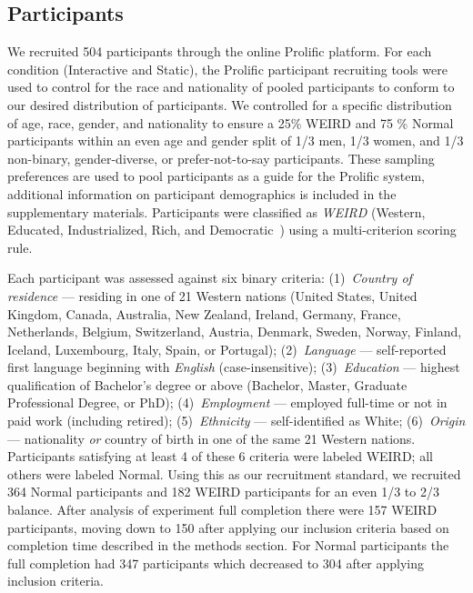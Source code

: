 \subsection{Participants}
We recruited 504 participants through the online Prolific platform. For each condition (Interactive and Static), the Prolific participant recruiting tools were used to control for the race and nationality of pooled participants to conform to our desired distribution of participants. We controlled for a specific distribution of age, race, gender, and nationality to ensure a 25\% WEIRD and 75 \% Normal participants within an even age and gender split of 1/3 men, 1/3 women, and 1/3 non-binary, gender-diverse, or prefer-not-to-say participants. These sampling preferences are used to pool participants as a guide for the Prolific system, additional information on participant demographics is included in the supplementary materials. Participants were classified as \emph{WEIRD} (Western, Educated, Industrialized, Rich, and Democratic~\citep{henrich2010weirdest}) using a multi-criterion scoring rule. 

Each participant was assessed against six binary criteria: (1)~\textit{Country of residence} --- residing in one of 21 Western nations (United States, United Kingdom, Canada, Australia, New Zealand, Ireland, Germany, France, Netherlands, Belgium, Switzerland, Austria, Denmark, Sweden, Norway, Finland, Iceland, Luxembourg, Italy, Spain, or Portugal); (2)~\textit{Language} --- self-reported first language beginning with \emph{English} (case-insensitive); (3)~\textit{Education} --- highest qualification of Bachelor's degree or above (Bachelor, Master, Graduate Professional Degree, or PhD); (4)~\textit{Employment} --- employed full-time or not in paid work (including retired); (5)~\textit{Ethnicity} --- self-identified as White; (6)~\textit{Origin} --- nationality \emph{or} country of birth in one of the same 21 Western nations. Participants satisfying at least 4 of these 6 criteria were labeled WEIRD; all others were labeled Normal. Using this as our recruitment standard, we recruited 364 Normal participants and 182 WEIRD participants for an even 1/3 to 2/3 balance. After analysis of experiment full completion there were 157 WEIRD participants, moving down to 150 after applying our inclusion criteria based on completion time described in the methods section. For Normal participants the full  completion had 347 participants which decreased to 304 after applying inclusion criteria. 